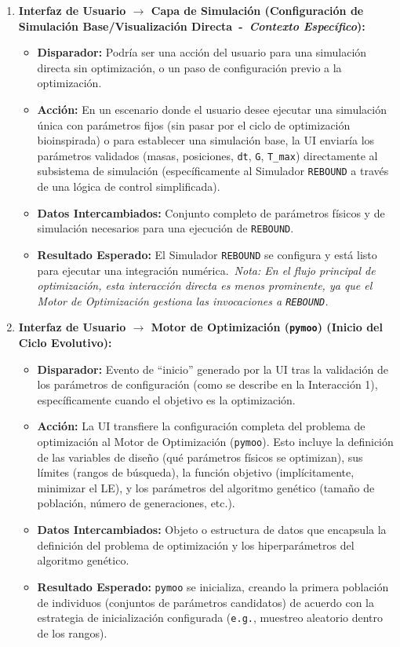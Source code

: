 \begin{enumerate}
    \item \textbf{Interfaz de Usuario $\rightarrow$ Capa de Simulación (Configuración de Simulación Base/Visualización Directa~-~\textit{Contexto Específico}):}
    \begin{itemize}
        \item \textbf{Disparador:} Podría ser una acción del usuario para una simulación directa sin optimización, o un paso de configuración previo a la optimización.
        \item \textbf{Acción:} En un escenario donde el usuario desee ejecutar una simulación única con parámetros fijos (sin pasar por el ciclo de optimización bioinspirada) o para establecer una simulación base, la UI enviaría los parámetros validados (masas, posiciones, \texttt{dt}, \texttt{G}, \texttt{T\_max}) directamente al subsistema de simulación (específicamente al Simulador \texttt{REBOUND} a través de una lógica de control simplificada).
        \item \textbf{Datos Intercambiados:} Conjunto completo de parámetros físicos y de simulación necesarios para una ejecución de \texttt{REBOUND}.
        \item \textbf{Resultado Esperado:} El Simulador \texttt{REBOUND} se configura y está listo para ejecutar una integración numérica.\ \textit{Nota: En el flujo principal de optimización, esta interacción directa es menos prominente, ya que el Motor de Optimización gestiona las invocaciones a \texttt{REBOUND}.}
    \end{itemize}

    \item \textbf{Interfaz de Usuario $\rightarrow$ Motor de Optimización (\texttt{pymoo}) (Inicio del Ciclo Evolutivo):}
    \begin{itemize}
        \item \textbf{Disparador:} Evento de ``inicio'' generado por la UI tras la validación de los parámetros de configuración (como se describe en la Interacción 1), específicamente cuando el objetivo es la optimización.
        \item \textbf{Acción:} La UI transfiere la configuración completa del problema de optimización al Motor de Optimización (\texttt{pymoo}). Esto incluye la definición de las variables de diseño (qué parámetros físicos se optimizan), sus límites (rangos de búsqueda), la función objetivo (implícitamente, minimizar el LE), y los parámetros del algoritmo genético (tamaño de población, número de generaciones, etc.).
        \item \textbf{Datos Intercambiados:} Objeto o estructura de datos que encapsula la definición del problema de optimización y los hiperparámetros del algoritmo genético.
        \item \textbf{Resultado Esperado:} \texttt{pymoo} se inicializa, creando la primera población de individuos (conjuntos de parámetros candidatos) de acuerdo con la estrategia de inicialización configurada (\texttt{e.g.}, muestreo aleatorio dentro de los rangos).
    \end{itemize}


\end{enumerate}
